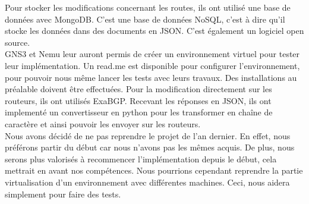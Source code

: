 Pour stocker les modifications concernant les routes, ils ont utilisé une base de données avec MongoDB. C'est une base de données NoSQL, c'est à dire qu'il stocke les données dans des documents en JSON. C'est également un logiciel open source.
\\ \indent
GNS3 et Nemu leur auront permis de créer un environnement virtuel pour tester leur implémentation. Un read.me est disponible pour configurer l'environnement, pour pouvoir nous même lancer les tests avec leurs travaux. Des installations au préalable doivent être effectuées.
Pour la modification directement sur les routeurs, ils ont utilisés ExaBGP. Recevant les réponses en JSON, ils ont implementé un convertisseur en python pour les transformer en chaîne de caractère et ainsi pouvoir les envoyer sur les routeurs. \\ \indent
Nous avons décidé de ne pas reprendre le projet de l'an dernier. En effet, nous préférons partir du début car nous n'avons pas les mêmes acquis. De plus, nous serons plus valorisés à recommencer l'implémentation depuis le début, cela mettrait en avant nos compétences. Nous pourrions cependant reprendre la partie virtualisation d'un environnement avec différentes machines. Ceci, nous aidera simplement pour faire des tests.
